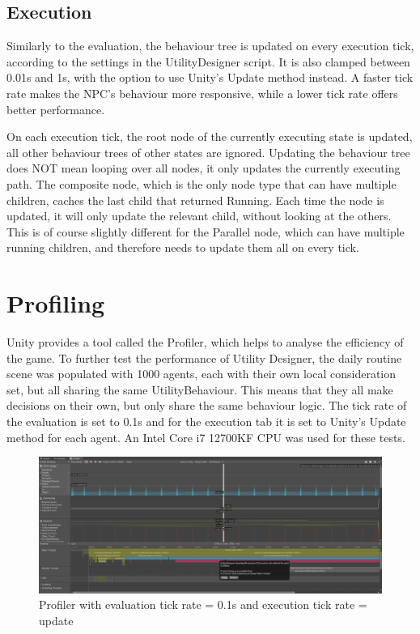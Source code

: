 \subsection{Execution}
\label{sec:performance_computationalefficiency_execution}

Similarly to the evaluation, the behaviour tree is updated on every execution tick, according to the settings in the UtilityDesigner script. It is also clamped between 0.01s and 1s, with the option to use Unity's Update method instead. A faster tick rate makes the NPC's behaviour more responsive, while a lower tick rate offers better performance.

\newpage

On each execution tick, the root node of the currently executing state is updated, all other behaviour trees of other states are ignored. Updating the behaviour tree does NOT mean looping over all nodes, it only updates the currently executing path. The composite node, which is the only node type that can have multiple children, caches the last child that returned Running. Each time the node is updated, it will only update the relevant child, without looking at the others. This is of course slightly different for the Parallel node, which can have multiple running children, and therefore needs to update them all on every tick.

\section{Profiling}
\label{sec:performance_profiling_profiling}

Unity provides a tool called the Profiler, which helps to analyse the efficiency of the game. To further test the performance of Utility Designer, the daily routine scene was populated with 1000 agents, each with their own local consideration set, but all sharing the same UtilityBehaviour. This means that they all make decisions on their own, but only share the same behaviour logic. The tick rate of the evaluation is set to 0.1s and for the execution tab it is set to Unity's Update method for each agent. An Intel Core i7 12700KF CPU was used for these tests.

\begin{figure}[H]
	\centering
		\includegraphics[scale=0.302]{images/utility_designer_profiling_1.png}
	\caption{Profiler with evaluation tick rate = 0.1s and execution tick rate = update}
	\label{fig:utility_designer_profiling_1}
\end{figure}

